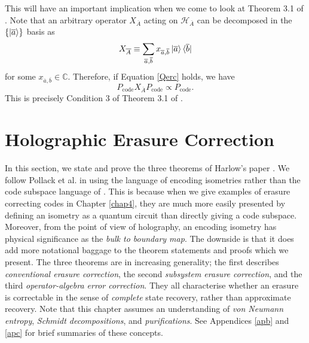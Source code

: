 \documentclass[12pt,a4paper]{report}
\numberwithin{equation}{section}
\newcommand{\ketbra}[2]{\ket{#1}\bra{#2}}
\newcommand{\Pc}{P_{\text{code}}}
\newcommand{\ol}[1]{\overline{#1}}
\theoremstyle{definition}
\theoremstyle{theorem}
\theoremstyle{theorem}
\theoremstyle{example}
\theoremstyle{definition}
\begin{document}
This will have an important implication when we come to look at Theorem 3.1 of \cite{Harlow}. Note that an arbitrary operator $X_{\ol{A}}$ acting on $\mathcal{H}_{\ol{A}}$ can be decomposed in the $\{\ket{\ol{a}}\}$ basis as
\begin{equation}
	X_{\ol{A}}\equiv \sum_{\ol{a},\ol{b}}x_{\ol{a},\ol{b}}\ketbra{\ol{a}}{\ol{b}}
\end{equation}
for some $x_{\ol{a},\ol{b}}\in\mathbb{C}$. Therefore, if Equation \ref{Qerc} holds, we have
\begin{equation}\label{EC}
	\Pc X_{\ol{A}}\Pc\propto\Pc.
\end{equation}
This is precisely Condition 3 of Theorem 3.1 of \cite{Harlow}.

\chapter{Holographic Erasure Correction}\label{chap3}
In this section, we state and prove the three theorems of Harlow's paper \cite{Harlow}. We follow Pollack et al. \cite{Pollack} in using the language of encoding isometries rather than the code subspace language of \cite{Harlow}. This is because when we give examples of erasure correcting codes in Chapter \ref{chap4}, they are much more easily presented by defining an isometry as a quantum circuit than directly giving a code subspace. Moreover, from the point of view of holography, an encoding isometry has physical significance as the \textit{bulk to boundary map}. The downside is that it does add more notational baggage to the theorem statements and proofs which we present. The three theorems are in increasing generality; the first describes \textit{conventional erasure correction}, the second \textit{subsystem erasure correction}, and the third \textit{operator-algebra error correction}. They all characterise whether an erasure is correctable in the sense of \textit{complete} state recovery, rather than approximate recovery. Note that this chapter assumes an understanding of \textit{von Neumann entropy}, \textit{Schmidt decompositions}, and \textit{purifications}. See Appendices \ref{apb} and \ref{apc} for brief summaries of these concepts.
\end{document}
